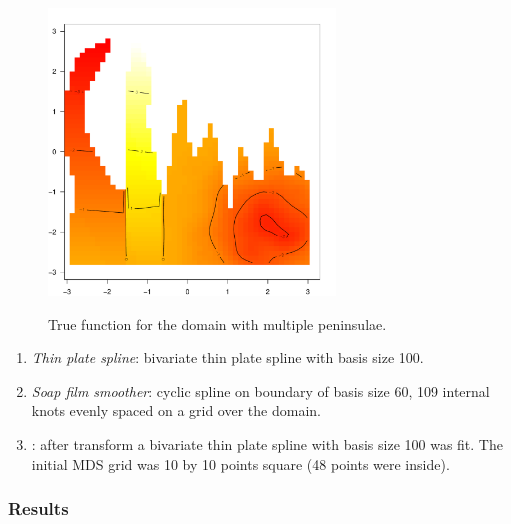 \begin{figure}
\centering
\includegraphics[width=3in]{mds/figs/wt2-truth.pdf} \\
\caption{True function for the domain with multiple peninsulae.}
\label{wt2-truth}
\end{figure}

\begin{enumerate}
\item \emph{Thin plate spline}: bivariate thin plate spline with basis size 100. 
\item \emph{Soap film smoother}: cyclic spline on boundary of basis size 60, 109 internal knots evenly spaced on a grid over the domain.
\item \emph{\mdsap}: after transform a bivariate thin plate spline with basis size 100 was fit. The initial MDS grid was 10 by 10 points square (48 points were inside).
\end{enumerate} 

\subsubsection{Results}

